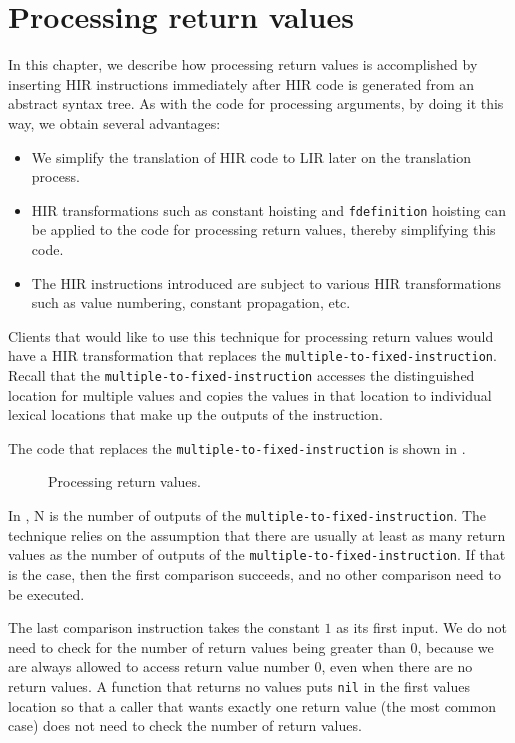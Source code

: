 \chapter{Processing return values}

In this chapter, we describe how processing return values is
accomplished by inserting HIR instructions immediately after HIR code
is generated from an abstract syntax tree.  As with the code for
processing arguments, by doing it this way, we obtain several
advantages:

\begin{itemize}
\item We simplify the translation of HIR code to LIR later on the
  translation process.
\item HIR transformations such as constant hoisting and
  \texttt{fdefinition} hoisting can be applied to the code for
  processing return values, thereby simplifying this code.
\item The HIR instructions introduced are subject to various HIR
  transformations such as value numbering, constant propagation,
  etc.
\end{itemize}

Clients that would like to use this technique for processing return
values would have a HIR transformation that replaces the
\texttt{multiple-to-fixed-instruction}.  Recall that the
\texttt{multiple-to-fixed-instruction} accesses the distinguished
location for multiple values and copies the values in that location to
individual lexical locations that make up the outputs of the
instruction.

The code that replaces the \texttt{multiple-to-fixed-instruction} is
shown in .

\begin{figure}
\begin{center}
\end{center}
\caption{\label{fig-process-values}
Processing return values.}
\end{figure}

In , N is the number of outputs of the
\texttt{multiple-to-fixed-instruction}.  The technique relies on the
assumption that there are usually at least as many return values as
the number of outputs of the \texttt{multiple-to-fixed-instruction}.
If that is the case, then the first comparison succeeds, and no other
comparison need to be executed.

The last comparison instruction takes the constant $1$ as its first
input.  We do not need to check for the number of return values being
greater than $0$, because we are always allowed to access return value
number $0$, even when there are no return values.  A function that
returns no values puts \texttt{nil} in the first values location so
that a caller that wants exactly one return value (the most common
case) does not need to check the number of return values.

